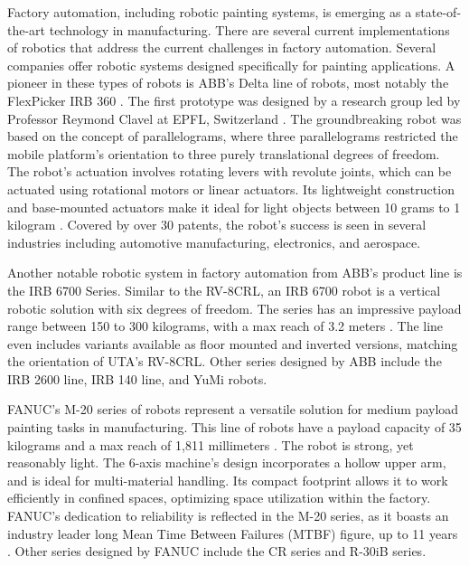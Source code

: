 
Factory automation, including robotic painting systems, is emerging as a state-of-the-art technology in manufacturing. There are several current implementations of robotics that address the current challenges in factory automation. Several companies offer robotic systems designed specifically for painting applications. A pioneer in these types of robots is ABB's Delta line of robots, most notably the FlexPicker IRB 360 \cite{robotsdonerightHistoryRobots}. The first prototype was designed by a research group led by Professor Reymond Clavel at EPFL, Switzerland \cite{bonev_delta_2001}. The groundbreaking robot was based on the concept of parallelograms, where three parallelograms restricted the mobile platform's orientation to three purely translational degrees of freedom. The robot's actuation involves rotating levers with revolute joints, which can be actuated using rotational motors or linear actuators. Its lightweight construction and base-mounted actuators make it ideal for light objects between 10 grams to 1 kilogram \cite{bonev_delta_2001}. Covered by over 30 patents, the robot's success is seen in several industries including automotive manufacturing, electronics, and aerospace.

Another notable robotic system in factory automation from ABB's product line is the IRB 6700 Series. Similar to the RV-8CRL, an IRB 6700 robot is a vertical robotic solution with six degrees of freedom. The series has an impressive payload range between 150 to 300 kilograms, with a max reach of 3.2 meters \cite{robotics2021product}. The line even includes variants available as floor mounted and inverted versions, matching the orientation of UTA's RV-8CRL. Other series designed by ABB include the IRB 2600 line, IRB 140 line, and YuMi robots.

FANUC's M-20 series of robots represent a versatile solution for medium payload painting tasks in manufacturing. This line of robots have a payload capacity of 35 kilograms and a max reach of 1,811 millimeters \cite{connolly2007new}. The robot is strong, yet reasonably light. The 6-axis machine's design incorporates a hollow upper arm, and is ideal for multi-material handling. Its compact footprint allows it to work efficiently in confined spaces, optimizing space utilization within the factory. FANUC's dedication to reliability is reflected in the M-20 series, as it boasts an industry leader long Mean Time Between Failures (MTBF) figure, up to 11 years \cite{aggogeri2020robotic}. Other series designed by FANUC include the CR series and R-30iB series.

